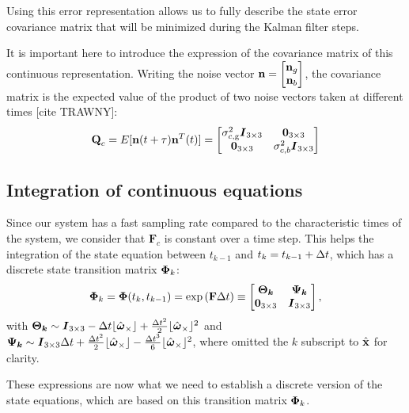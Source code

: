Using this error representation allows us to fully describe the state error covariance matrix that will be minimized during the Kalman filter steps. 

It is important here to introduce the expression of the covariance matrix of this continuous representation. Writing the noise vector $\textrm{\textbf{n}} = \begin{bmatrix} \textbf{n}_g \\ \textbf{n}_b \end{bmatrix}$, the covariance matrix is the expected value of the product of two noise vectors taken at different times [cite TRAWNY]:
\begin{equation}
\textrm{\textbf{Q}}_c = E[\textrm{\textbf{n}}(t+\tau)\textrm{\textbf{n}}^T(t)] = 
\begin{bmatrix} \sigma_{c,\textrm{g}}^2\boldsymbol{I}_{3\times 3} & \boldsymbol{0}_{3\times 3}\\ \boldsymbol{0}_{3\times 3} & \sigma_{c,b}^2\boldsymbol{I}_{3\times 3}\end{bmatrix}
\end{equation}

\subsection{Integration of continuous equations}

Since our system has a fast sampling rate compared to the characteristic times of the system, we consider that $\boldsymbol{F}_c$ is constant over a time step. This helps the integration of the state equation between $t_{k-1}$ and $t_k=t_{k-1}+\Delta t$, which has a discrete state transition matrix $\boldsymbol{\Phi}_k$:
\begin{equation}
\boldsymbol{\Phi}_k = \boldsymbol{\Phi}(t_k, t_{k-1}) = \exp\left(\textrm{\textbf{F}}\Delta t\right) \equiv \begin{bmatrix} \boldsymbol{\Theta_k} & \boldsymbol{\Psi_k} \\ \boldsymbol{0}_{3\times 3} & \boldsymbol{I}_{3\times 3}\end{bmatrix},
\end{equation}
with $\boldsymbol{\Theta_k} \sim \boldsymbol{I}_{3\times 3} - \Delta t\lfloor \hat{\boldsymbol\omega}_\times \rfloor + \frac{\Delta t^2}{2}\lfloor \hat{\boldsymbol\omega}_\times \rfloor^2$ and $\boldsymbol{\Psi_k} \sim \boldsymbol{I}_{3\times 3}\Delta t +  \frac{\Delta t^2}{2}\lfloor \hat{\boldsymbol\omega}_\times \rfloor - \frac{\Delta t^3}{6}\lfloor \hat{\boldsymbol\omega}_\times \rfloor^2$, where omitted the $k$ subscript to $\hat{\textrm{\textbf{x}}}$ for clarity.

These expressions are now what we need to establish a discrete version of the state equations, which are based on this transition matrix $\boldsymbol{\Phi}_k$.

